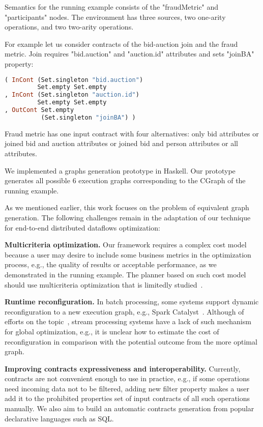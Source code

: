 Semantics for the running example consists of the "fraudMetric" and "participants" nodes.
The environment has three sources, two one-arity operations, and two two-arity operations.

For example let us consider contracts of the bid-auction join and the fraud metric.
Join requires "bid.auction" and "auction.id" attributes and sets "joinBA" property:
\begin{lstlisting}[language=Haskell]
( InCont (Set.singleton "bid.auction")
         Set.empty Set.empty
, InCont (Set.singleton "auction.id")
         Set.empty Set.empty
, OutCont Set.empty
          (Set.singleton "joinBA") )
\end{lstlisting}

Fraud metric has one input contract with four alternatives:
only bid attributes
or joined bid and auction attributes
or joined bid and person attributes
or all attributes.

We implemented a graphs generation prototype in Haskell.
Our prototype generates all possible 6 execution graphs corresponding to the CGraph of the running example.

As we mentioned earlier, this work focuses on the problem of equivalent graph generation. The following challenges remain in the adaptation of our technique for end-to-end distributed dataflows optimization:

\textbf{Multicriteria optimization.}
Our framework requires a complex cost model because a user may desire to include some business metrics in the optimization process, e.g., the quality of results or acceptable performance, as we demonstrated in the running example. The planner based on such cost model should use multicriteria optimization that is limitedly studied~\cite{yarygina2014optimizing}.

\textbf{Runtime reconfiguration.}
In batch processing, some systems support dynamic reconfiguration to a new execution graph, e.g., Spark Catalyst~\cite{armbrust2015spark}. Although of efforts on the topic~\cite{grulich2020grizzly}, stream processing systems have a lack of such mechanism for global optimization, e.g., it is unclear how to estimate the cost of reconfiguration in comparison with the potential outcome from the more optimal graph.

\textbf{Improving contracts expressiveness and interoperability.}
Currently, contracts are not convenient enough to use in practice, e.g., if some operations need incoming data not to be filtered, adding new filter property makes a user add it to the prohibited properties set of input contracts of all such operations manually. We also aim to build an automatic contracts generation from popular declarative languages such as SQL.